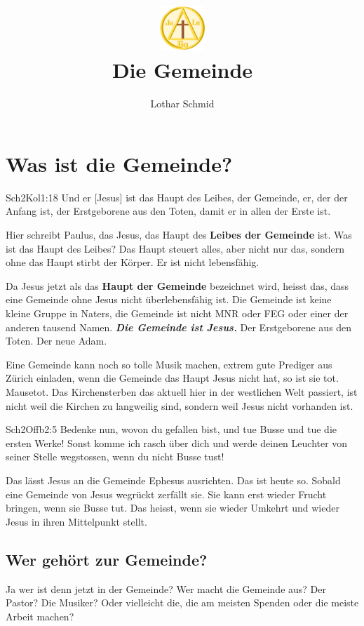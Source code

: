 \documentclass[12pt,a4paper]{scrarticle}
\title{\includegraphics[height=48pt]{assets/images/logo.png}\\Die Gemeinde}
\author{Lothar Schmid}
\begin{document}
\maketitle
\section{Was ist die Gemeinde?}
\begin{bibeltext}{Sch2}{Kol}{1:18}
    Und er [Jesus] ist das Haupt des Leibes, der Gemeinde, er, der der Anfang ist, der
Erstgeborene aus den Toten, damit er in allen der Erste ist.
\end{bibeltext}
Hier schreibt Paulus, das Jesus, das Haupt des \textbf{Leibes der Gemeinde} ist. Was ist das Haupt des
Leibes? Das Haupt steuert alles, aber nicht nur das, sondern ohne das Haupt stirbt der Körper.
Er ist nicht lebensfähig.

Da Jesus jetzt als das \textbf{Haupt der Gemeinde} bezeichnet wird, heisst das, dass eine Gemeinde
ohne Jesus nicht überlebensfähig ist. Die Gemeinde ist keine kleine Gruppe in Naters, die Gemeinde
ist nicht MNR oder FEG oder einer der anderen tausend Namen. \textbf{\textit{Die Gemeinde ist Jesus.}} Der Erstgeborene aus den Toten. Der neue Adam.

Eine Gemeinde kann noch so tolle Musik machen, extrem gute Prediger aus Zürich einladen,
wenn die Gemeinde das Haupt Jesus nicht hat, so ist sie tot. Mausetot. Das Kirchensterben das
aktuell hier in der westlichen Welt passiert, ist nicht weil die Kirchen zu langweilig sind, sondern
weil Jesus nicht vorhanden ist.
\begin{bibeltext}{Sch2}{Offb}{2:5}
Bedenke nun, wovon du gefallen bist, und tue Busse und tue die ersten Werke! Sonst
komme ich rasch über dich und werde deinen Leuchter von seiner Stelle wegstossen,
wenn du nicht Busse tust!
\end{bibeltext}
Das lässt Jesus an die Gemeinde Ephesus ausrichten. Das ist heute so. Sobald eine Gemeinde von
Jesus wegrückt zerfällt sie. Sie kann erst wieder Frucht bringen, wenn sie Busse tut. Das heisst,
wenn sie wieder Umkehrt und wieder Jesus in ihren Mittelpunkt stellt.
\subsection{Wer gehört zur Gemeinde?}
Ja wer ist denn jetzt in der Gemeinde? Wer macht die Gemeinde aus? Der Pastor? Die Musiker?
Oder vielleicht die, die am meisten Spenden oder die meiste Arbeit machen?
\end{document}
